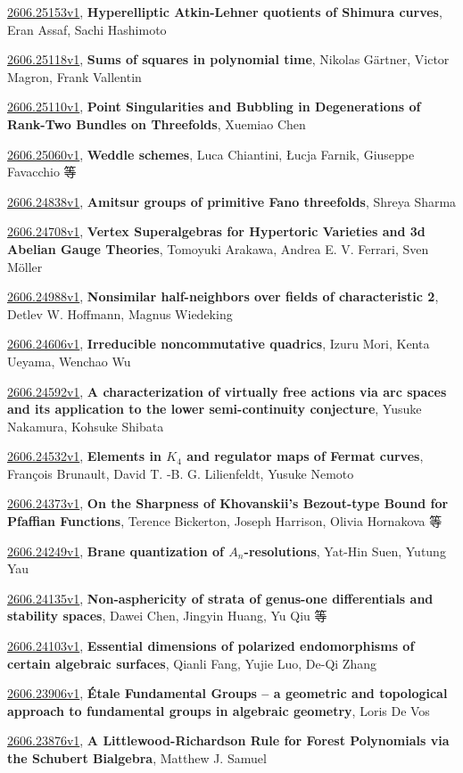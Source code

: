 \documentclass[9pt, a4paper]{article}
\theoremstyle{plain}
\theoremstyle{definition}
\theoremstyle{remark}
\newcommand{\arxiv}[3]{\href{https://arxiv.org/abs/#1}{#1}, \textbf{\textcolor{arxivblue}{#2}}, #3}
\begin{document}
\arxiv{2606.25153v1}{Hyperelliptic Atkin-Lehner quotients of Shimura curves}{Eran Assaf, Sachi Hashimoto}

\arxiv{2606.25118v1}{Sums of squares in polynomial time}{Nikolas Gärtner, Victor Magron, Frank Vallentin}

\arxiv{2606.25110v1}{Point Singularities and Bubbling in Degenerations of Rank-Two Bundles on Threefolds}{Xuemiao Chen}

\arxiv{2606.25060v1}{Weddle schemes}{Luca Chiantini, Łucja Farnik, Giuseppe Favacchio 等}

\arxiv{2606.24838v1}{Amitsur groups of primitive Fano threefolds}{Shreya Sharma}

\arxiv{2606.24708v1}{Vertex Superalgebras for Hypertoric Varieties and 3d Abelian Gauge Theories}{Tomoyuki Arakawa, Andrea E. V. Ferrari, Sven Möller}

\arxiv{2606.24988v1}{Nonsimilar half-neighbors over fields of characteristic 2}{Detlev W. Hoffmann, Magnus Wiedeking}

\arxiv{2606.24606v1}{Irreducible noncommutative quadrics}{Izuru Mori, Kenta Ueyama, Wenchao Wu}

\arxiv{2606.24592v1}{A characterization of virtually free actions via arc spaces and its application to the lower semi-continuity conjecture}{Yusuke Nakamura, Kohsuke Shibata}

\arxiv{2606.24532v1}{Elements in $K_4$ and regulator maps of Fermat curves}{François Brunault, David T. -B. G. Lilienfeldt, Yusuke Nemoto}

\arxiv{2606.24373v1}{On the Sharpness of Khovanskii's Bezout-type Bound for Pfaffian Functions}{Terence Bickerton, Joseph Harrison, Olivia Hornakova 等}

\arxiv{2606.24249v1}{Brane quantization of $A_n$-resolutions}{Yat-Hin Suen, Yutung Yau}

\arxiv{2606.24135v1}{Non-asphericity of strata of genus-one differentials and stability spaces}{Dawei Chen, Jingyin Huang, Yu Qiu 等}

\arxiv{2606.24103v1}{Essential dimensions of polarized endomorphisms of certain algebraic surfaces}{Qianli Fang, Yujie Luo, De-Qi Zhang}

\arxiv{2606.23906v1}{Étale Fundamental Groups -- a geometric and topological approach to fundamental groups in algebraic geometry}{Loris De Vos}

\arxiv{2606.23876v1}{A Littlewood-Richardson Rule for Forest Polynomials via the Schubert Bialgebra}{Matthew J. Samuel}
\end{document}
